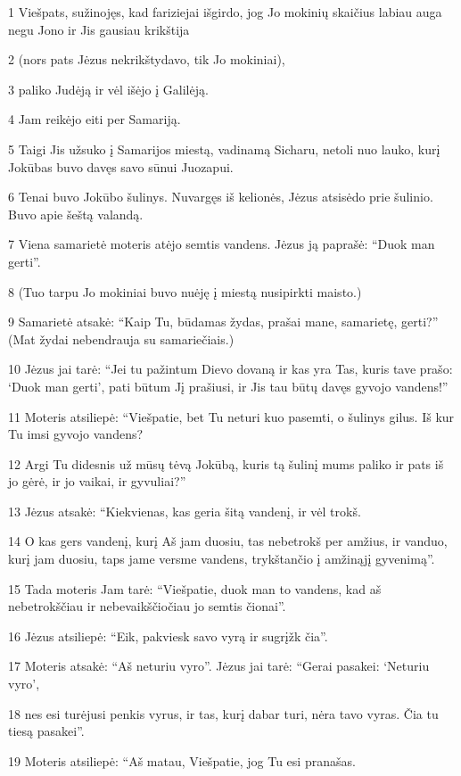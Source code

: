\par 1 Viešpats, sužinojęs, kad fariziejai išgirdo, jog Jo mokinių skaičius labiau auga negu Jono ir Jis gausiau krikštija 
\par 2 (nors pats Jėzus nekrikštydavo, tik Jo mokiniai), 
\par 3 paliko Judėją ir vėl išėjo į Galilėją. 
\par 4 Jam reikėjo eiti per Samariją. 
\par 5 Taigi Jis užsuko į Samarijos miestą, vadinamą Sicharu, netoli nuo lauko, kurį Jokūbas buvo davęs savo sūnui Juozapui. 
\par 6 Tenai buvo Jokūbo šulinys. Nuvargęs iš kelionės, Jėzus atsisėdo prie šulinio. Buvo apie šeštą valandą. 
\par 7 Viena samarietė moteris atėjo semtis vandens. Jėzus ją paprašė: “Duok man gerti”. 
\par 8 (Tuo tarpu Jo mokiniai buvo nuėję į miestą nusipirkti maisto.) 
\par 9 Samarietė atsakė: “Kaip Tu, būdamas žydas, prašai mane, samarietę, gerti?” (Mat žydai nebendrauja su samariečiais.) 
\par 10 Jėzus jai tarė: “Jei tu pažintum Dievo dovaną ir kas yra Tas, kuris tave prašo: ‘Duok man gerti’, pati būtum Jį prašiusi, ir Jis tau būtų davęs gyvojo vandens!” 
\par 11 Moteris atsiliepė: “Viešpatie, bet Tu neturi kuo pasemti, o šulinys gilus. Iš kur Tu imsi gyvojo vandens? 
\par 12 Argi Tu didesnis už mūsų tėvą Jokūbą, kuris tą šulinį mums paliko ir pats iš jo gėrė, ir jo vaikai, ir gyvuliai?” 
\par 13 Jėzus atsakė: “Kiekvienas, kas geria šitą vandenį, ir vėl trokš. 
\par 14 O kas gers vandenį, kurį Aš jam duosiu, tas nebetrokš per amžius, ir vanduo, kurį jam duosiu, taps jame versme vandens, trykštančio į amžinąjį gyvenimą”. 
\par 15 Tada moteris Jam tarė: “Viešpatie, duok man to vandens, kad aš nebetrokščiau ir nebevaikščiočiau jo semtis čionai”. 
\par 16 Jėzus atsiliepė: “Eik, pakviesk savo vyrą ir sugrįžk čia”. 
\par 17 Moteris atsakė: “Aš neturiu vyro”. Jėzus jai tarė: “Gerai pasakei: ‘Neturiu vyro’, 
\par 18 nes esi turėjusi penkis vyrus, ir tas, kurį dabar turi, nėra tavo vyras. Čia tu tiesą pasakei”. 
\par 19 Moteris atsiliepė: “Aš matau, Viešpatie, jog Tu esi pranašas. 
